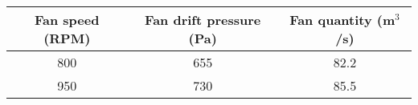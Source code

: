 \begin{tabular}{|c|c|c|}
\hline
\textbf{Fan speed (RPM)} & \textbf{Fan drift pressure (Pa)} & \textbf{Fan quantity (m$^3$/s)} \\
\hline
800 & 655 & 82.2 \\
950 & 730 & 85.5 \\
\hline
\end{tabular}
